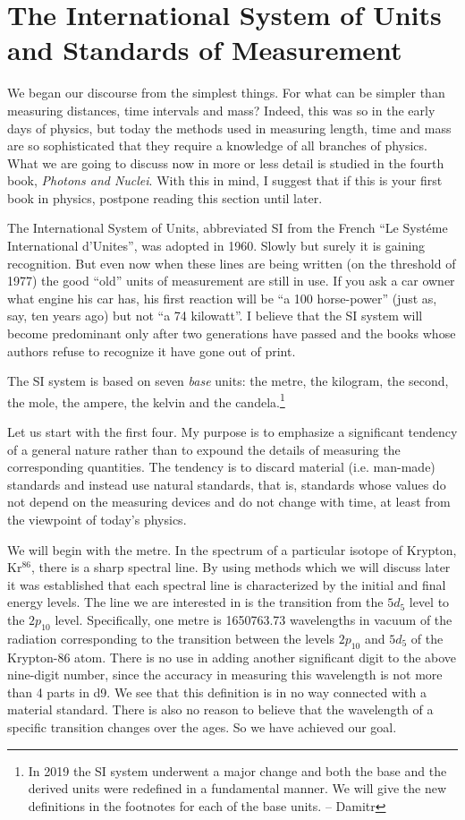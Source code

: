 \section[The SI System and Standards of Measurement]{The International System of Units
and Standards of Measurement}
We began our discourse from the simplest things. For what can be
simpler than measuring distances, time intervals and mass? Indeed,
this was so in the early days of physics, but today the methods used
in measuring length, time and mass are so sophisticated that they
require a knowledge of all branches of physics. What we are going to
discuss now in more or less detail is studied in the fourth book,
\emph{Photons and Nuclei}. With this in mind, I suggest that if this is your
first book in physics, postpone reading this section until later.


The International System of Units, abbreviated SI from the French ``Le Syst\'eme International d'Unites'', was adopted in 1960. Slowly but surely it is gaining recognition. But even now when these lines are being written (on the threshold of 1977) the good ``old'' units of measurement are still in use. If you ask a car owner what engine his car has, his first reaction will be ``a 100 horse-power'' (just as, say, ten years ago) but not ``a 74 kilowatt''.  I believe that the SI system will become predominant only after two generations have passed and the books whose authors refuse to recognize it have gone out of print.  

The SI system is based on seven \emph{base} units: the metre, the kilogram, the second, the mole, the ampere, the kelvin and the candela.\footnote{In 2019 the SI system underwent a major change and both the base and the derived units were redefined in a fundamental manner. We will give the new definitions in the footnotes for each of the base units. -- Damitr}

Let us start with the first four. My purpose is to emphasize a
significant tendency of a general nature rather than to expound the
details of measuring the corresponding quantities. The tendency is to
discard material (i.e. man-made) standards and instead use natural
standards, that is, standards whose values do not depend on the
measuring devices and do not change with time, at least from the
viewpoint of today's physics.


We will begin with the metre. In the spectrum of a particular
isotope of Krypton, Kr$^{86}$, there is a sharp spectral line. By using
methods which we will discuss later it was established that each
spectral line is characterized by the initial and final energy
levels. The line we are interested in is the transition from the $5d_{5}$
level to the $2p_{10}$ level. Specifically, one metre is \num{1650763.73} wavelengths in vacuum of the radiation corresponding to the transition
between the levels $2p_{10}$ and $5d_{5}$ of the Krypton-$86$ atom. There is no
use in adding another significant digit to the above nine-digit
number, since the accuracy in measuring this wavelength is not more
than 4 parts in \num{d9}. We see that this definition is in no way
connected with a material standard. There is also no reason to believe
that the wavelength of a specific transition changes over the ages. So
we have achieved our goal.  


